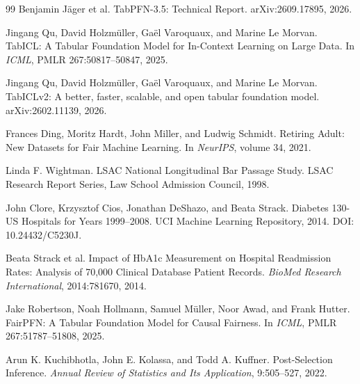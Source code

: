 \documentclass[10pt]{article}
\begin{document}
\begin{thebibliography}{99}
Benjamin J{\"a}ger et al.
\newblock TabPFN-3.5: Technical Report.
\newblock arXiv:2609.17895, 2026.

Jingang Qu, David Holzm{\"u}ller, Ga{\"e}l Varoquaux, and Marine Le Morvan.
\newblock TabICL: A Tabular Foundation Model for In-Context Learning on Large Data.
\newblock In \emph{ICML}, PMLR 267:50817--50847, 2025.

Jingang Qu, David Holzm{\"u}ller, Ga{\"e}l Varoquaux, and Marine Le Morvan.
\newblock TabICLv2: A better, faster, scalable, and open tabular foundation model.
\newblock arXiv:2602.11139, 2026.

Frances Ding, Moritz Hardt, John Miller, and Ludwig Schmidt.
\newblock Retiring Adult: New Datasets for Fair Machine Learning.
\newblock In \emph{NeurIPS}, volume 34, 2021.

Linda F. Wightman.
\newblock LSAC National Longitudinal Bar Passage Study.
\newblock LSAC Research Report Series, Law School Admission Council, 1998.

John Clore, Krzysztof Cios, Jonathan DeShazo, and Beata Strack.
\newblock Diabetes 130-US Hospitals for Years 1999--2008.
\newblock UCI Machine Learning Repository, 2014. DOI: 10.24432/C5230J.

Beata Strack et al.
\newblock Impact of HbA1c Measurement on Hospital Readmission Rates: Analysis of 70,000 Clinical Database Patient Records.
\newblock \emph{BioMed Research International}, 2014:781670, 2014.


Jake Robertson, Noah Hollmann, Samuel M{\"u}ller, Noor Awad, and Frank Hutter.
\newblock FairPFN: A Tabular Foundation Model for Causal Fairness.
\newblock In \emph{ICML}, PMLR 267:51787--51808, 2025.

Arun K. Kuchibhotla, John E. Kolassa, and Todd A. Kuffner.
\newblock Post-Selection Inference.
\newblock \emph{Annual Review of Statistics and Its Application}, 9:505--527, 2022.


\end{thebibliography}
\end{document}
